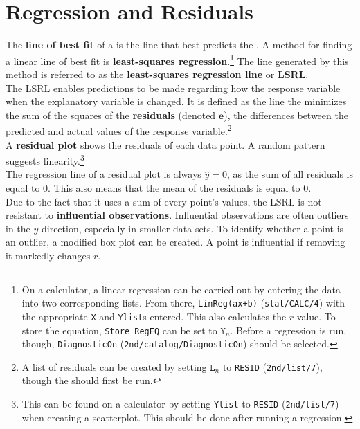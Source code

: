 \documentclass[../AP_Statistics.tex]{subfiles}
\begin{document}
		\section{Regression and Residuals}
			The \textbf{line of best fit} of a  is the line that best predicts the . A method for finding a linear line of best fit is \textbf{least-squares regression}.\footnote{On a calculator, a linear regression can be carried out by entering the data into two corresponding lists. From there, \texttt{LinReg(ax+b)} (\texttt{stat/CALC/4}) with the appropriate \texttt{X} and \texttt{Ylist}s entered. This also calculates the $r$ value. To store the equation, \texttt{Store RegEQ} can be set to $\texttt{Y}_n$. Before a regression is run, though, \texttt{DiagnosticOn} (\texttt{2nd/catalog/DiagnosticOn}) should be selected.} The line generated by this method is referred to as the \textbf{least-squares regression line} or \textbf{LSRL}. \\
			The LSRL enables predictions to be made regarding how the response variable when the explanatory variable is changed. It is defined as the line the minimizes the sum of the squares of the \textbf{residuals} (denoted $\pmb{e}$), the differences between the predicted and actual values of the response variable.\footnote{A list of residuals can be created by setting $\texttt{L}_n$ to \texttt{RESID} (\texttt{2nd/list/7}), though the  should first be run.} \\
			A \textbf{residual plot} shows the residuals of each data point. A random pattern suggests linearity.\footnote{This can be found on a calculator by setting \texttt{Ylist} to \texttt{RESID} (\texttt{2nd/list/7}) when creating a scatterplot. This should be done after running a regression.} \\
			The regression line of a residual plot is always $\hat{y} = 0$, as the sum of all residuals is equal to 0. This also means that the mean of the residuals is equal to 0. \\
			Due to the fact that it uses a sum of every point's values, the LSRL is not resistant to \textbf{influential observations}. Influential observations are often outliers in the $y$ direction, especially in smaller data sets. To identify whether a point is an outlier, a modified box plot can be created. A point is influential if removing it markedly changes $r$. \\
\end{document}
